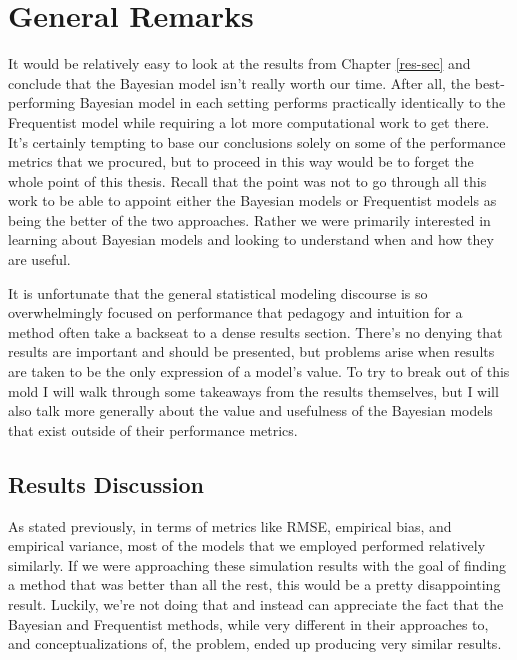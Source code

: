 \documentclass[12pt,twoside]{reedthesis}
\begin{document}
\hypertarget{general-remarks}{%
\section{General Remarks}\label{general-remarks}}

It would be relatively easy to look at the results from Chapter \ref{res-sec} and conclude that the Bayesian model isn't really worth our time. After all, the best-performing Bayesian model in each setting performs practically identically to the Frequentist model while requiring a lot more computational work to get there. It's certainly tempting to base our conclusions solely on some of the performance metrics that we procured, but to proceed in this way would be to forget the whole point of this thesis. Recall that the point was not to go through all this work to be able to appoint either the Bayesian models or Frequentist models as being the better of the two approaches. Rather we were primarily interested in learning about Bayesian models and looking to understand when and how they are useful.

It is unfortunate that the general statistical modeling discourse is so overwhelmingly focused on performance that pedagogy and intuition for a method often take a backseat to a dense results section. There's no denying that results are important and should be presented, but problems arise when results are taken to be the only expression of a model's value. To try to break out of this mold I will walk through some takeaways from the results themselves, but I will also talk more generally about the value and usefulness of the Bayesian models that exist outside of their performance metrics.

\hypertarget{results-discussion}{%
\subsection{Results Discussion}\label{results-discussion}}

As stated previously, in terms of metrics like RMSE, empirical bias, and empirical variance, most of the models that we employed performed relatively similarly. If we were approaching these simulation results with the goal of finding a method that was better than all the rest, this would be a pretty disappointing result. Luckily, we're not doing that and instead can appreciate the fact that the Bayesian and Frequentist methods, while very different in their approaches to, and conceptualizations of, the problem, ended up producing very similar results.
\end{document}

